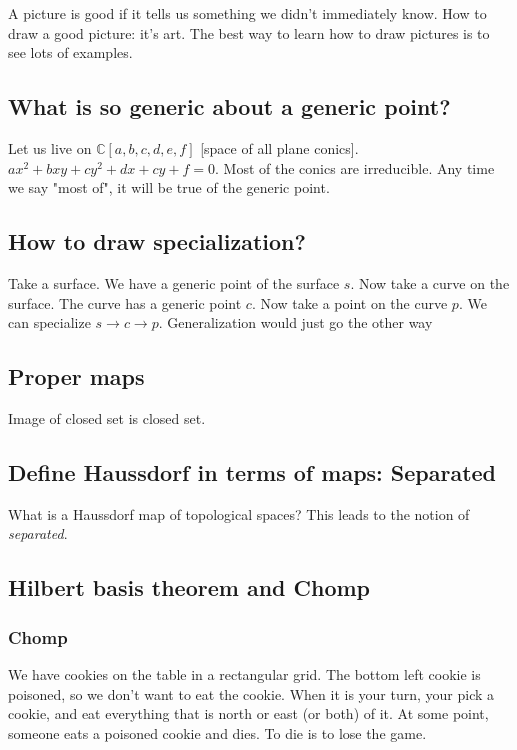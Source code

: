 \documentclass{book}
\newcommand{\C}{\ensuremath{\mathbb{C}}}
\theoremstyle{definition}
\begin{document}
A picture is good if it tells us something we didn't immediately know. How
to draw a good picture: it's art. The best way to learn how to draw pictures
is to see lots of examples. 

\subsection{What is so generic about a generic point?}

Let us live on $\C[a, b, c, d, e, f]$ [space of all plane conics].
$a x^2 + bxy + cy^2 + dx + cy + f = 0$. Most of the conics are irreducible.
Any time we say "most of", it will be true of the generic point.

\subsection{How to draw specialization?}

Take a surface. We have a generic point of the surface $s$. Now take a curve on
the surface. The curve has a generic point $c$. Now take a point on the curve $p$.
We can specialize $s \rightarrow c \rightarrow p$. Generalization would just
go the other way

\subsection{Proper maps}
Image of closed set is closed set.

\subsection{Define Haussdorf in terms of maps: Separated}
What is a Haussdorf map of topological spaces? This leads to the notion
of \emph{separated}.

\subsection{Hilbert basis theorem and Chomp}

\subsubsection{Chomp}
We have cookies on the table in a rectangular grid. The bottom left cookie
is poisoned, so we don't want to eat the cookie. When it is your turn,
your pick a cookie, and eat everything that is north or east (or both) of it.
At some point, someone eats a poisoned cookie and dies. To die is to lose the
game. 
\end{document}
